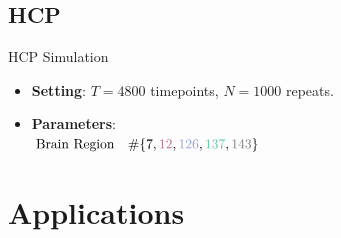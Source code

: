 \documentclass[12pt]{beamer}
\begin{document}
\subsection{HCP}
\begin{frame}{HCP Simulation}
\footnotesize
\begin{itemize}
    \item \textbf{Setting}: $T = 4800$ timepoints, $N = 1000$ repeats.
    \item \textbf{Parameters}:\\
    $\text{Brain Region} \quad \# \{\textcolor[HTML]{000000}{7}, \textcolor[HTML]{B66B7C}{12}, \textcolor[HTML]{8D9FCB}{126}, \textcolor[HTML]{66C2A6}{137}, \textcolor[HTML]{7D7D7D}{143}\}$\\
\end{itemize}

\centering
{}
\vspace{0.25cm}
\end{frame}


\section{Applications}

\end{document}
